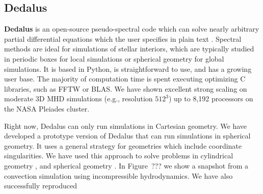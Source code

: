 {\color{purple}    
\subsection{Dedalus}}

\textbf{Dedalus} is an open-source pseudo-spectral code which can solve nearly arbitrary partial differential equations which the user specifies in plain text \citep[][source code at: dedalus-project.org]{Burns2016}. Spectral methods are ideal for simulations of stellar interiors, which are typically studied in periodic boxes for local simulations or spherical geometry for global simulations. It is based in Python, is straightforward to use, and has a growing user base. The majority of computation time is spent executing optimizing C libraries, such as FFTW or BLAS. We have shown excellent strong scaling on moderate 3D MHD simulations (e.g., resolution $512^3$) up to 8,192 processors on the NASA Pleiades cluster.

Right now, Dedalus can only run simulations in Cartesian geometry. We have developed a prototype version of Dedalus that can run simulations in spherical geometry. It uses a general strategy for geometries which include coordinate singularities. We have used this approach to solve problems in cylindrical geometry \cite{Vasil_2016}, and spherical geometry \citep[][submitted to JCP]{p}. In Figure~??? we show a snapshot from a convection simulation using incompressible hydrodynamics. We have also successfully reproduced 


